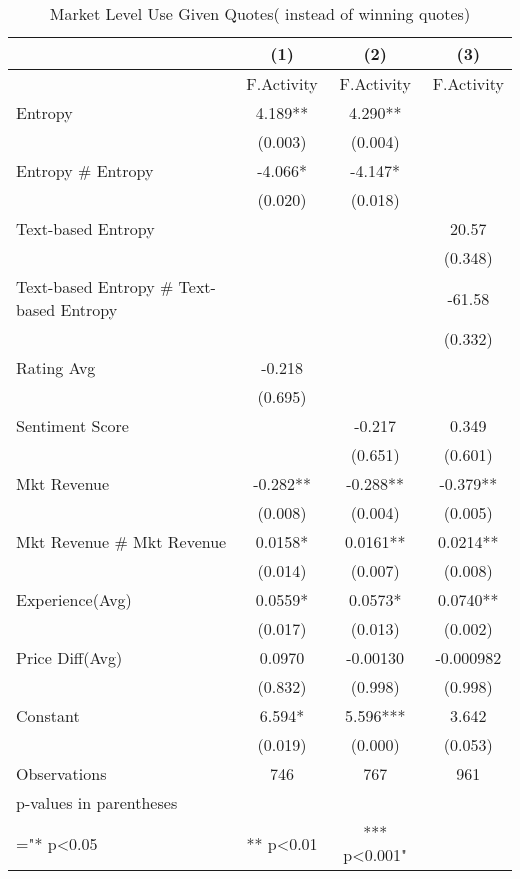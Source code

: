\begin{table}[]
\centering
\begin{tabular}{@{}lccc@{}}
\toprule
 & (1) & (2) & (3) \\ \midrule
 & F.Activity & F.Activity & F.Activity \\
Entropy & 4.189** & 4.290** &  \\
 & (0.003) & (0.004) &  \\
Entropy \# Entropy & -4.066* & -4.147* &  \\
 & (0.020) & (0.018) &  \\
Text-based Entropy &  &  & 20.57 \\
 &  &  & (0.348) \\
Text-based Entropy \# Text-based Entropy &  &  & -61.58 \\
 &  &  & (0.332) \\
Rating Avg & -0.218 &  &  \\
 & (0.695) &  &  \\
Sentiment Score &  & -0.217 & 0.349 \\
 &  & (0.651) & (0.601) \\
Mkt Revenue & -0.282** & -0.288** & -0.379** \\
 & (0.008) & (0.004) & (0.005) \\
Mkt Revenue \# Mkt Revenue & 0.0158* & 0.0161** & 0.0214** \\
 & (0.014) & (0.007) & (0.008) \\
Experience(Avg) & 0.0559* & 0.0573* & 0.0740** \\
 & (0.017) & (0.013) & (0.002) \\
Price Diff(Avg) & 0.0970 & -0.00130 & -0.000982 \\
 & (0.832) & (0.998) & (0.998) \\
Constant & 6.594* & 5.596*** & 3.642 \\
 & (0.019) & (0.000) & (0.053) \\
Observations & 746 & 767 & 961 \\
p-values in parentheses &  &  &  \\
="* p\textless{}0.05 & ** p\textless{}0.01 & *** p\textless{}0.001" &  \\ \bottomrule
\end{tabular}
\caption{Market Level Use Given Quotes( instead of winning quotes) }
\label{reg_mkt_3}
\end{table}